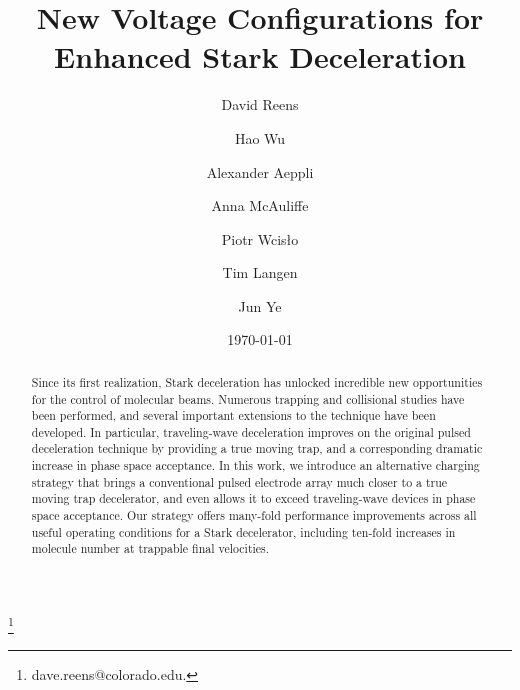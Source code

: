 \documentclass[%
 reprint,
 amsmath,amssymb,
 aps,
prl,
]{revtex4-1}
\begin{document}
\title{New Voltage Configurations for Enhanced Stark Deceleration}%

\author{David Reens}
\thanks{dave.reens@colorado.edu.}

\author{Hao Wu}
\author{Alexander Aeppli}
\author{Anna McAuliffe}
\author{Piotr Wcis\l o}
\author{Tim Langen}%

\author{Jun Ye}


\date{\today}



\begin{abstract}
Since its first realization, Stark deceleration has unlocked incredible new opportunities for the control of molecular beams. 
Numerous trapping and collisional studies have been performed, and several important extensions to the technique have been developed. 
In particular, traveling-wave deceleration improves on the original pulsed deceleration technique by providing a true moving trap, and a corresponding dramatic increase in phase space acceptance.
In this work, we introduce an alternative charging strategy that brings a conventional pulsed electrode array much closer to a true moving trap decelerator, and even allows it to exceed traveling-wave devices in phase space acceptance.
Our strategy offers many-fold performance improvements across all useful operating conditions for a Stark decelerator, including ten-fold increases in molecule number at trappable final velocities.
\end{abstract}

\maketitle
\end{document}
